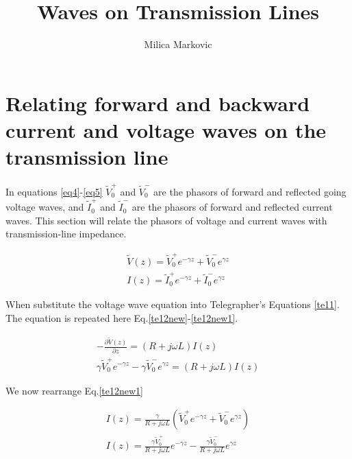 \documentclass{ximera}
\title{Waves on Transmission Lines}
\author{Milica Markovic}
\begin{document}
  
\begin{abstract}  

\end{abstract}  
\maketitle    











\section{Relating forward and backward current and voltage waves on
the transmission line}


In equations \ref{eq4}-\ref{eq5} $\tilde{V}_0^+$ and $\tilde{V}_0^-$ are the phasors of forward and
reflected going voltage waves, and $\tilde{I}_0^+$ and $\tilde{I}_0^-$ are the phasors of forward and
reflected current waves. This section will relate the phasors of voltage and
current waves with transmission-line impedance.


\begin{eqnarray}
\tilde{V}(z)=\tilde{V}_0^+ e^{-\gamma z} + \tilde{V}_0^- e^{\gamma z}\label{eq4} \\
I(z)=\tilde{I}_0^+ e^{-\gamma z} + \tilde{I}_0^- e^{\gamma z}\label{eq5}
\end{eqnarray}




When substitute the voltage wave equation into Telegrapher's  Equations
\ref{te11}. The equation is repeated here  Eq.\ref{te12new}-\ref{te12new1}.




\begin{eqnarray}
-\frac{\partial \tilde{V}(z)}{\partial z} = (R+j\omega L) I(z) \label{te12new} \\
\gamma \tilde{V}_0^+ e^{-\gamma z} - \gamma \tilde{V}_0^- e^{\gamma z} = (R+ j \omega
L) I(z) \label{te12new1}
\end{eqnarray}

We now rearrange Eq.\ref{te12new1}

\begin{eqnarray}
I(z)=\frac{\gamma}{R+j\omega L} ( \tilde{V}_0^+ e^{-\gamma z} + \tilde{V}_0^-
 e^{\gamma z})  \nonumber  \\
I(z)=\frac{\gamma \tilde{V}_0^+}{R+ j \omega L} e^{-\gamma z} - \frac{\gamma \tilde{V}_0^-}{R+ j \omega L} e^{\gamma z} \label{eq3}
\end{eqnarray}
\end{document}

